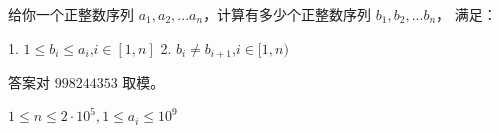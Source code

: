 给你一个正整数序列 $a_1,a_2,...a_n$，计算有多少个正整数序列 $b_1,b_2,...b_n$， 满足：

1. $1\le b_i \le a_i$,$i\in [1,n]$
2. $b_i\neq b_{i+1}$,$i\in [1,n)$

答案对 $998244353$ 取模。

$ 1 \le n \le 2 \cdot 10^5 ,1 \le a_i \le 10^9$
